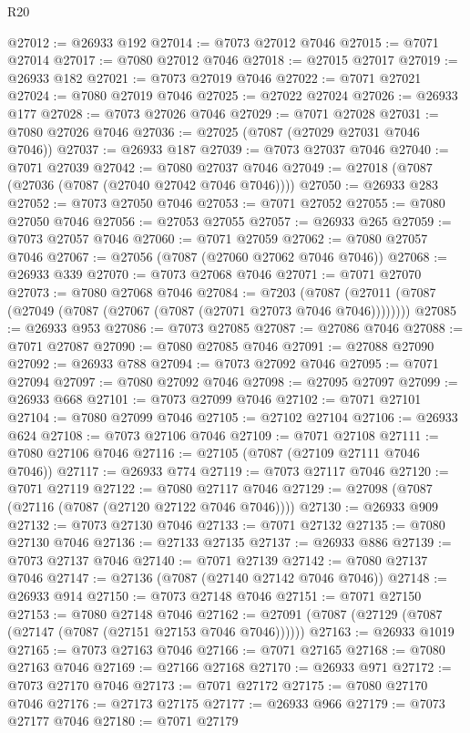 \begin{lexlean}{R20}
\begin{coremodule}
{@27012 := @26933 @192
@27014 := @7073 @27012 @7046
@27015 := @7071 @27014
@27017 := @7080 @27012 @7046
@27018 := @27015 @27017
@27019 := @26933 @182
@27021 := @7073 @27019 @7046
@27022 := @7071 @27021
@27024 := @7080 @27019 @7046
@27025 := @27022 @27024
@27026 := @26933 @177
@27028 := @7073 @27026 @7046
@27029 := @7071 @27028
@27031 := @7080 @27026 @7046
@27036 := @27025 (@7087 (@27029 @27031 @7046 @7046))
@27037 := @26933 @187
@27039 := @7073 @27037 @7046
@27040 := @7071 @27039
@27042 := @7080 @27037 @7046
@27049 := @27018 (@7087 (@27036 (@7087 (@27040 @27042 @7046 @7046))))
@27050 := @26933 @283
@27052 := @7073 @27050 @7046
@27053 := @7071 @27052
@27055 := @7080 @27050 @7046
@27056 := @27053 @27055
@27057 := @26933 @265
@27059 := @7073 @27057 @7046
@27060 := @7071 @27059
@27062 := @7080 @27057 @7046
@27067 := @27056 (@7087 (@27060 @27062 @7046 @7046))
@27068 := @26933 @339
@27070 := @7073 @27068 @7046
@27071 := @7071 @27070
@27073 := @7080 @27068 @7046
@27084 := @7203
    (@7087 (@27011 (@7087 (@27049 (@7087 (@27067 (@7087 (@27071 @27073 @7046 @7046))))))))
@27085 := @26933 @953
@27086 := @7073 @27085
@27087 := @27086 @7046
@27088 := @7071 @27087
@27090 := @7080 @27085 @7046
@27091 := @27088 @27090
@27092 := @26933 @788
@27094 := @7073 @27092 @7046
@27095 := @7071 @27094
@27097 := @7080 @27092 @7046
@27098 := @27095 @27097
@27099 := @26933 @668
@27101 := @7073 @27099 @7046
@27102 := @7071 @27101
@27104 := @7080 @27099 @7046
@27105 := @27102 @27104
@27106 := @26933 @624
@27108 := @7073 @27106 @7046
@27109 := @7071 @27108
@27111 := @7080 @27106 @7046
@27116 := @27105 (@7087 (@27109 @27111 @7046 @7046))
@27117 := @26933 @774
@27119 := @7073 @27117 @7046
@27120 := @7071 @27119
@27122 := @7080 @27117 @7046
@27129 := @27098 (@7087 (@27116 (@7087 (@27120 @27122 @7046 @7046))))
@27130 := @26933 @909
@27132 := @7073 @27130 @7046
@27133 := @7071 @27132
@27135 := @7080 @27130 @7046
@27136 := @27133 @27135
@27137 := @26933 @886
@27139 := @7073 @27137 @7046
@27140 := @7071 @27139
@27142 := @7080 @27137 @7046
@27147 := @27136 (@7087 (@27140 @27142 @7046 @7046))
@27148 := @26933 @914
@27150 := @7073 @27148 @7046
@27151 := @7071 @27150
@27153 := @7080 @27148 @7046
@27162 := @27091 (@7087 (@27129 (@7087 (@27147 (@7087 (@27151 @27153 @7046 @7046))))))
@27163 := @26933 @1019
@27165 := @7073 @27163 @7046
@27166 := @7071 @27165
@27168 := @7080 @27163 @7046
@27169 := @27166 @27168
@27170 := @26933 @971
@27172 := @7073 @27170 @7046
@27173 := @7071 @27172
@27175 := @7080 @27170 @7046
@27176 := @27173 @27175
@27177 := @26933 @966
@27179 := @7073 @27177 @7046
@27180 := @7071 @27179
}
\end{coremodule}
\end{lexlean}
